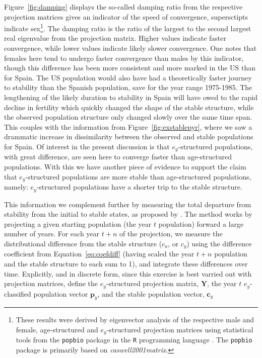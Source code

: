 Figure~\ref{fig:damping} displays the so-called damping ratio from the
respective projection matrices gives an indicator of the speed of convergence,
supersctipts indicate sex\footnote{These results were derived by eigenvector
analysis of the respective male and female, age-structured and
$e_y$-structured projection matrices using statistical tools from the
\texttt{popbio} package \citep{popbio2007} in the
\texttt{R} programming language \citep{Rcitation}. The \texttt{popbio} package
is primarily based on \textit{caswell2001matrix}.}. The damping ratio is the 
ratio of the largest to the second largest real eigenvalue from the projection 
matrix\citep[p. 101]{caswell2001matrix}. Higher values indicate faster 
convergence, while lower values indicate likely slower convergence. One notes 
that females here tend to undergo faster convergence than
males by this indicator, though this difference has been more consistent and
more marked in the US than for Spain. The US population would also have had a
theoretically faster journey to stability than the Spanish population, save for
the year range 1975-1985. The lengthening of the likely duration to stability in
Spain will have owed to the rapid decline in fertility which quickly changed the
shape of the stable structure, while the observed population structure only
changed slowly over the same time span. This couples with the information from
Figure~\ref{fig:exstablepyr}, where we saw a drammatic increase in
dissimilarity between the observed and stable populations for Spain. Of interest
in the present discussion is that $e_y$-structured populations, with great difference, 
are seen here to converge faster than age-structured populations. With this we 
have another piece of evidence to support the claim that $e_y$-structured populations are more stable than
age-structured populations, namely: $e_y$-structured populations have a shorter
trip to the stable structure.

This information we complement further by measuring the total departure from
stability from the initial to stable states, as proposed by
\citet{cohen1979cumulative}. The method works by projecting a given starting
population (the year $t$ population) forward a large number of years. For each
year $t+n$ of the projection, we measure the distributional difference from
the stable structure ($c_a$, or $c_y$) using the difference coefficient from
Equation~\ref{eq:coefdiff} (having scaled the year $t+n$ population and the
stable structure to each sum to 1), and integrate these differences over time.
Explicitly, and in discrete form, since this exercise is best varried out with
projection matrices, define the $e_y$-structured projection matrix,
$\textbf{Y}$, the year $t$ $e_y$-classified population vector
$\textbf{p}_y$, and the stable population vector, $\textbf{c}_y$

